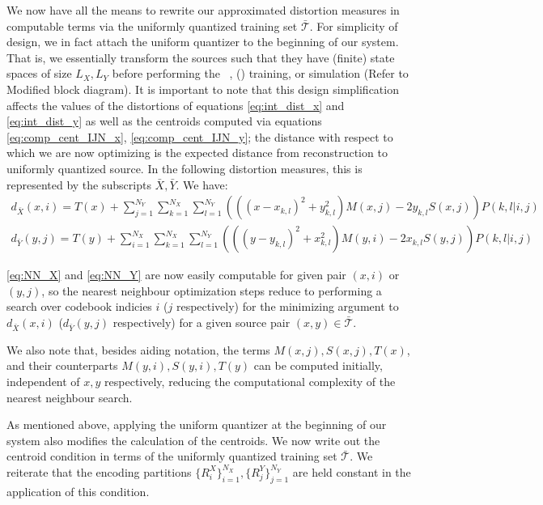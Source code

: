 We now have all the means to rewrite our approximated distortion measures in computable terms via the uniformly quantized training set $\mathcal{\bar T}$. For simplicity of design, we in fact attach the uniform quantizer to the beginning of our system. That is, we essentially transform the sources such that they have (finite) state spaces of size $L_X, L_Y$ before performing the \sysIJN\ , (\sysIJ) training, or simulation (Refer to Modified block diagram). It is important to note that this design simplification affects the values of the distortions of equations \eqref{eq:int_dist_x} and \eqref{eq:int_dist_y} as well as the centroids computed via equations \eqref{eq:comp_cent_IJN_x}, \eqref{eq:comp_cent_IJN_y}; the distance with respect to which we are now optimizing is the expected distance from reconstruction to uniformly quantized source. In the following distortion measures, this is represented by the subscripts $\bar X,\bar Y$. We have:
\begin{align}
    \label{eq:NN_X}
    d_{\bar X}(x,i) =
            T(x) + 
            \sum_{j=1}^{N_Y} \sum_{k=1}^{N_X} \sum_{l=1}^{N_Y}
            \left(\left({(x-x_{k,l})}^2 +
            y_{k,l}^2\right)M(x,j) -2y_{k,l}S(x,j)\right)P(k,l|i,j)\\
    \label{eq:NN_Y}
    d_{\bar Y}(y,j) =
            T(y) + 
            \sum_{i=1}^{N_X} \sum_{k=1}^{N_X} \sum_{l=1}^{N_Y}
            \left(\left({(y-y_{k,l})}^2 +
            x_{k,l}^2\right)M(y,i) -2x_{k,l}S(y,j)\right)P(k,l|i,j)
\end{align}

\eqref{eq:NN_X} and \eqref{eq:NN_Y} are now easily computable for given pair $(x, i)$ or $(y, j)$, so the nearest neighbour optimization steps reduce to performing a search over codebook indicies $i$ ($j$ respectively) for the minimizing argument to $d_{\bar X}(x,i)$ ($d_{\bar Y}(y,j)$ respectively) for a given source pair $(x,y)\in \mathcal{\bar T}$.

We also note that, besides aiding notation, the terms $M(x,j),S(x,j),T(x)$, and their counterparts $M(y,i),S(y,i),T(y)$ can be computed initially, independent of $x, y$ respectively, reducing the computational complexity of the nearest neighbour search.

As mentioned above, applying the uniform quantizer at the beginning of our system also modifies the calculation of the centroids. We now write out the centroid condition in terms of the uniformly quantized training set $\mathcal{\bar T}$. We reiterate that the encoding partitions $\{R_i^X\}_{i=1}^{N_X}, \{R_j^Y\}_{j=1}^{N_Y}$ are held constant in the application of this condition.

